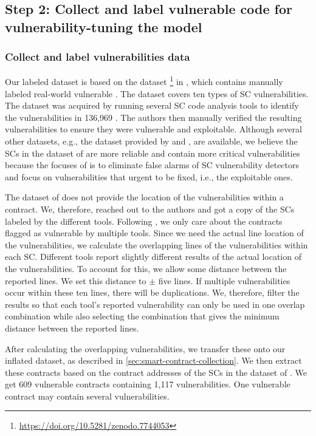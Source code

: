 \documentclass[12pt]{book}
\begin{document}
\subsection{Step 2: Collect and label vulnerable code for vulnerability-tuning the model}
\label{sec:step2}
\subsubsection{Collect and label vulnerabilities data}
\label{sec:vulnerable-contracts}

Our labeled dataset is based on the dataset \footnote{\url{https://doi.org/10.5281/zenodo.7744053}} in \cite{Hu2023}, which contains manually labeled real-world vulnerable . The dataset covers ten types of SC vulnerabilities. The dataset was acquired by running several SC code analysis tools to identify the vulnerabilities in 136,969 . The authors then manually verified the resulting vulnerabilities to ensure they were vulnerable and exploitable. Although several other datasets, e.g., the dataset provided by \cite{solidifi} and  \cite{EmpiricalOnSmartBug}, are available, we believe the SCs in the dataset of \cite{Hu2023} are more reliable and contain more critical vulnerabilities because the focuses of \cite{Hu2023} is to eliminate false alarms of SC vulnerability detectors and focus on vulnerabilities that urgent to be fixed, i.e., the exploitable ones.

The dataset of \cite{Hu2023} does not provide the location of the vulnerabilities within a contract. We, therefore, reached out to the authors and got a copy of the SCs labeled by the different tools. Following \cite{Hu2023}, we only care about the contracts flagged as vulnerable by multiple tools. Since we need the actual line location of the vulnerabilities, we calculate the overlapping lines of the vulnerabilities within each SC. Different tools report slightly different results of the actual location of the vulnerabilities. To account for this, we allow some distance between the reported lines. We set this distance to \(\pm\) five lines. If multiple vulnerabilities occur within these ten lines, there will be duplications. We, therefore, filter the results so that each tool's reported vulnerability can only be used in one overlap combination while also selecting the combination that gives the minimum distance between the reported lines.

After calculating the overlapping vulnerabilities, we transfer these onto our inflated dataset, as described in \cref{sec:smart-contract-collection}. We then extract these contracts based on the contract addresses of the SCs in the dataset of \cite{Hu2023}. We get 609 vulnerable contracts containing 1,117  vulnerabilities. One vulnerable contract may contain several vulnerabilities.
\end{document}
